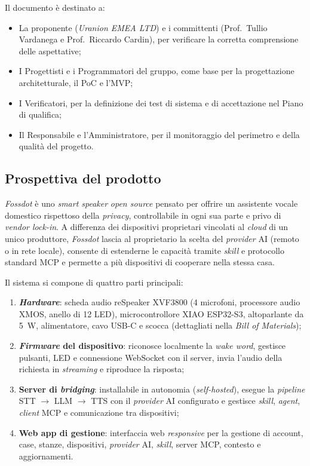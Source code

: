\documentclass[12pt,a4paper]{article}
\newcommand{\tightlist}{\setlength{\itemsep}{1pt}\setlength{\parskip}{0pt}}
\begin{document}
Il documento è destinato a:
\begin{itemize}
\tightlist
\item La proponente (\emph{Uranion EMEA LTD}) e i committenti (Prof.\ Tullio Vardanega e Prof.\ Riccardo Cardin), per verificare la corretta comprensione delle aspettative;
\item I Progettisti e i Programmatori del gruppo, come base per la progettazione architetturale, il PoC e l'MVP;
\item I Verificatori, per la definizione dei test di sistema e di accettazione nel Piano di qualifica;
\item Il Responsabile e l'Amministratore, per il monitoraggio del perimetro e della qualità del progetto.
\end{itemize}
 
\subsection{Prospettiva del prodotto}
 
\emph{Fossdot} è uno \emph{smart speaker} \emph{open source} pensato per offrire un assistente vocale domestico rispettoso della \emph{privacy}, controllabile in ogni sua parte e privo di \emph{vendor lock-in}. A differenza dei dispositivi proprietari vincolati al \emph{cloud} di un unico produttore, \emph{Fossdot} lascia al proprietario la scelta del \emph{provider} AI (remoto o in rete locale), consente di estenderne le capacità tramite \emph{skill} e protocollo standard MCP e permette a più dispositivi di cooperare nella stessa casa.
 
Il sistema si compone di quattro parti principali:
\begin{enumerate}
\tightlist
\item \textbf{\emph{Hardware}}: scheda audio reSpeaker XVF3800 (4 microfoni, processore audio XMOS, anello di 12 LED), microcontrollore XIAO ESP32-S3, altoparlante da 5~W, alimentatore, cavo USB-C e scocca (dettagliati nella \emph{Bill of Materials});
\item \textbf{\emph{Firmware} del dispositivo}: riconosce localmente la \emph{wake word}, gestisce pulsanti, LED e connessione WebSocket con il server, invia l'audio della richiesta in \emph{streaming} e riproduce la risposta;
\item \textbf{Server di \emph{bridging}}: installabile in autonomia (\emph{self-hosted}), esegue la \emph{pipeline} STT $\rightarrow$ LLM $\rightarrow$ TTS con il \emph{provider} AI configurato e gestisce \emph{skill}, \emph{agent}, \emph{client} MCP e comunicazione tra dispositivi;
\item \textbf{Web app di gestione}: interfaccia web \emph{responsive} per la gestione di account, case, stanze, dispositivi, \emph{provider} AI, \emph{skill}, server MCP, contesto e aggiornamenti.
\end{enumerate}
 
\end{document}
